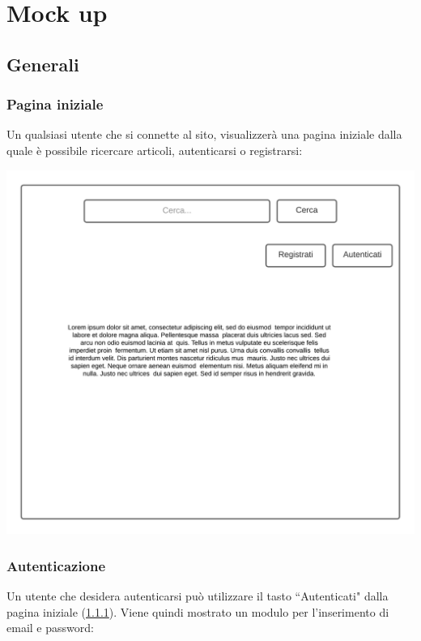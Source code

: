 \documentclass[12pt]{article}
\begin{document}
\newpage

\section{Mock up}
\subsection{Generali}
\subsubsection{Pagina iniziale}
\label{mockup:paginainiziale}
Un qualsiasi utente che si connette al sito, visualizzerà una pagina iniziale dalla quale è possibile ricercare articoli, autenticarsi o registrarsi:

\begin{center}
\includegraphics[height=0.3\textheight]{Mockup/PaginaIniziale}
\end{center}

\subsubsection{Autenticazione}
\label{mockup:auth}
Un utente che desidera autenticarsi può utilizzare il tasto ``Autenticati" dalla pagina iniziale (\ref{mockup:paginainiziale}).
Viene quindi mostrato un modulo per l'inserimento di email e password:
\end{document}

